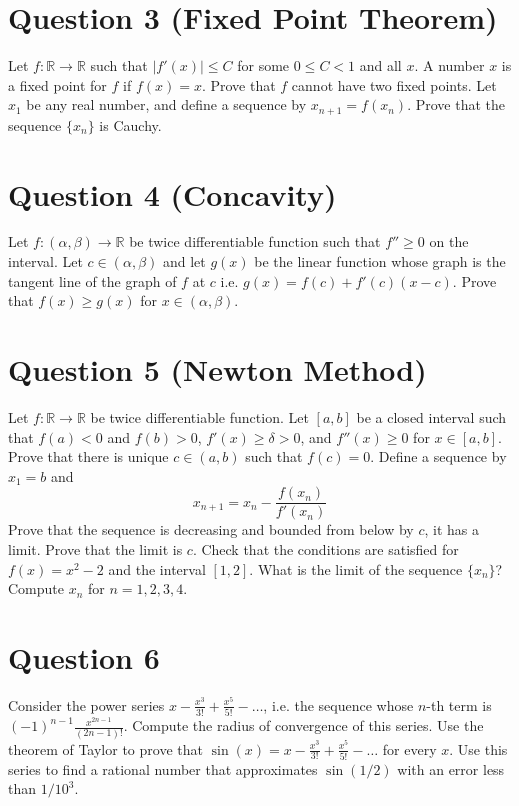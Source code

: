 \documentclass[12pt, letterpaper]{article}
\begin{document}
\section*{Question 3 (Fixed Point Theorem)}
Let $f: \mathbb R \rightarrow \mathbb R$ such that $|f'(x)| \leq C$ for some $0\leq C< 1$ and all $x$.  A number $x$ is a fixed point for $f$ if
$f(x)=x$. Prove that $f$ cannot have two fixed points.
Let $x_1$ be any real number, and define
a sequence by $x_{n+1}=f(x_n)$. Prove that the sequence $\{x_n\}$ is Cauchy.
\section*{Question 4 (Concavity)}
Let $f: (\alpha,\beta)  \rightarrow \mathbb R$ be twice differentiable function such that $f''\geq 0$ on the interval. Let $c\in (\alpha,\beta)$ and let $g(x)$ be the linear
function whose graph is the tangent line of the graph of $f$ at $c$ i.e. $g(x)=f(c) + f'(c)(x-c)$. Prove that $f(x)\geq g(x)$ for $x\in (\alpha,\beta)$.
\section*{Question 5 (Newton Method)}
Let $f: \mathbb R \rightarrow \mathbb R$ be twice differentiable function. Let $[a,b]$ be a closed interval such that $f(a) <0$ and $f(b)>0$, $f'(x) \geq \delta>0$,
and $f''(x)\geq 0$ for $x\in [a,b]$. Prove that there is unique $c\in (a,b)$ such that $f(c)=0$. Define a sequence by $x_1=b$ and
\[
x_{n+1} = x_n -\frac{f(x_n)}{f'(x_{n})}
\]
Prove that the sequence is decreasing and bounded from below by $c$, it has a limit.
Prove that the limit is $c$.  Check that the conditions are
satisfied for $f(x)=x^2-2$ and the interval
$[1,2]$. What is the limit of the sequence $\{x_n\}$? Compute $x_n$  for $n=1,2,3,4$.
\section*{Question 6}
Consider the power series $x-\frac{x^3}{3!} + \frac{x^5}{5!} - \ldots$, i.e. the sequence whose $n$-th term is $(-1)^{n-1}\frac{x^{2n-1}}{(2n-1)!}$. Compute the
radius of convergence of this series. Use the theorem of Taylor to prove that $\sin(x)=x-\frac{x^3}{3!} + \frac{x^5}{5!} - \ldots$ for every $x$.
Use this series to find a rational number that approximates $\sin(1/2)$ with an error less than $1/10^3$.
\end{document}
